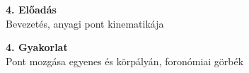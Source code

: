 \begin{center}
    \large \textbf{4. Előadás}\\
    Bevezetés, anyagi pont kinematikája
\end{center}





\newpage
\begin{center}
    \large \textbf{4. Gyakorlat}\\
    Pont mozgása egyenes és körpályán, foronómiai görbék
\end{center}